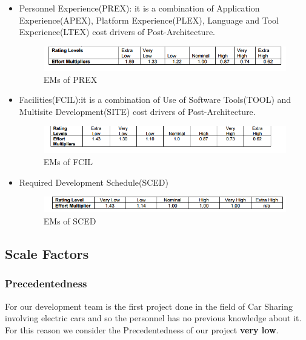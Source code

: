 \begin{itemize}
\begin{itemize}[label = {-}]
\item Personnel Experience(PREX): it is a combination of Application Experience(APEX), Platform Experience(PLEX), Language and Tool Experience(LTEX) cost drivers of Post-Architecture. 
\begin{figure}[H]	
	\centering
	\includegraphics[scale = 0.6]{img/PREX.png}
	\caption{EMs of PREX}
\end{figure}

\item Facilities(FCIL):it is a combination of Use of Software Tools(TOOL) and Multisite Development(SITE) cost drivers of Post-Architecture. 

\begin{figure}[H]	
	\centering
	\includegraphics[scale = 0.6]{img/FCIL.png}
	\caption{EMs of FCIL}
\end{figure}

\item Required Development Schedule(SCED)

\begin{figure}[H]	
	\centering
	\includegraphics[scale = 0.6]{img/SCED.png}
	\caption{EMs of SCED}
\end{figure}

\end{itemize} 
\end{itemize}

\subsection{Scale Factors}
\subsubsection{Precedentedness}
For our development team is the first project done in the field of Car Sharing involving electric cars and so the personnel has no previous knowledge about it. For this reason we consider the Precedentedness of our project \textbf{very low}.

